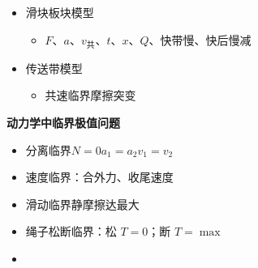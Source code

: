 \begin{itemize}
\item 滑块板块模型
  \begin{itemize}
  \item $F$、$a$、$v_{\text{共}}$、$t$、$x$、$Q$、快带慢、快后慢减 %
  \end{itemize}
\end{itemize}
\begin{itemize}
\item 传送带模型
  \begin{itemize}
  \item 共速临界\quad 摩擦突变
  \end{itemize}
\end{itemize}
\textbf{动力学中临界极值问题}
\begin{itemize}
\item 分离临界\quad $N=0$\quad $a_1=a_2$\quad $v_1=v_2$
\item 速度临界：合外力、收尾速度 %
\item 滑动临界\quad 静摩擦达最大
\item 绳子松断临界：松 $T=0$；断 $T=\max$
\item {} %
\end{itemize}
